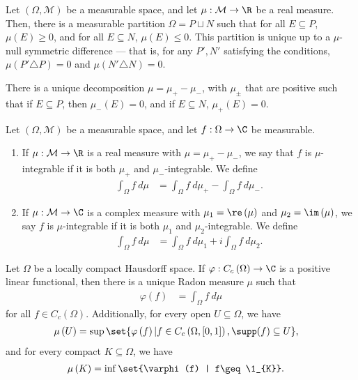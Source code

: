 \begin{theorem}
  Let $\left(\Omega,\mathcal{M}\right)$ be a measurable space, and let $\mu: \mathcal{M}\rightarrow \R$ be a real measure. Then, there is a measurable partition $\Omega = P\sqcup N$ such that for all $E\subseteq P$, $\mu(E) \geq 0$, and for all $E\subseteq N$, $\mu(E) \leq 0$. This partition is unique up to a $\mu$-null symmetric difference --- that is, for any $P',N'$ satisfying the conditions, $\mu\left(P'\triangle P\right) = 0$ and $\mu\left(N'\triangle N\right) = 0$.\newline

  There is a unique decomposition $\mu = \mu_{+} - \mu_{-}$, with $\mu_{\pm}$ that are positive such that if $E\subseteq P$, then $\mu_{-}\left(E\right) = 0$, and if $E\subseteq N$, $\mu_{+}\left(E\right) = 0$.
\end{theorem}
\begin{definition}
  Let $\left(\Omega,\mathcal{M}\right)$ be a measurable space, and let $f: \Omega\rightarrow \C$ be measurable.
  \begin{enumerate}[(1)]
    \item If $\mu: \mathcal{M}\rightarrow \R$ is a real measure with $\mu = \mu_{+} - \mu_{-}$, we say that $f$ is $\mu$-integrable if it is both $\mu_{+}$ and $\mu_{-}$-integrable. We define
      \begin{align*}
        \int_{\Omega}^{} f\:d\mu &= \int_{\Omega}^{} f\:d\mu_{+} - \int_{\Omega}^{} f\:d\mu_{-}.
      \end{align*}
    \item If $\mu:\mathcal{M}\rightarrow \C$ is a complex measure with $\mu_{1} = \re\left(\mu\right)$ and $\mu_{2} = \im\left(\mu\right)$, we say $f$ is $\mu$-integrable if it is both $\mu_{1}$ and $\mu_{2}$-integrable. We define
      \begin{align*}
        \int_{\Omega}^{} f\:d\mu &= \int_{\Omega}^{} f\:d\mu_{1} + i\int_{\Omega}^{} f\:d\mu_{2}.
      \end{align*}
  \end{enumerate}
\end{definition}
\begin{theorem}
  Let $\Omega$ be a locally compact Hausdorff space. If $\varphi: C_{c}\left(\Omega\right)\rightarrow \C$ is a positive linear functional, then there is a unique Radon measure $\mu$ such that
  \begin{align*}
    \varphi\left(f\right) &= \int_{\Omega}^{} f\:d\mu
  \end{align*}
  for all $f\in C_c\left(\Omega\right)$. Additionally, for every open $U\subseteq \Omega$, we have
  \begin{align*}
    \mu\left(U\right) &= \sup\set{\varphi\left(f\right) | f\in C_c\left(\Omega,[0,1]\right),\supp(f) \subseteq U},
  \end{align*}
  and for every compact $K\subseteq \Omega$, we have
  \begin{align*}
    \mu\left(K\right) &= \inf\set{\varphi(f) | f\geq \1_{K}}.
  \end{align*}
\end{theorem}
